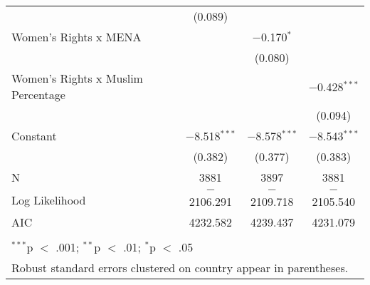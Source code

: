 \begin{table}[!htbp]
\begin{tabular}{@{\extracolsep{5pt}}lccc}
  & (0.089) &  &  \\ 
  Women's Rights x MENA &  & $-$0.170$^{*}$ &  \\ 
  &  & (0.080) &  \\ 
  Women's Rights x Muslim Percentage &  &  & $-$0.428$^{***}$ \\ 
  &  &  & (0.094) \\ 
  Constant & $-$8.518$^{***}$ & $-$8.578$^{***}$ & $-$8.543$^{***}$ \\ 
  & (0.382) & (0.377) & (0.383) \\ 
 N & 3881 & 3897 & 3881 \\ 
Log Likelihood & $-$2106.291 & $-$2109.718 & $-$2105.540 \\ 
AIC & 4232.582 & 4239.437 & 4231.079 \\ 
\hline \\[-1.8ex] 
\multicolumn{4}{l}{$^{***}$p $<$ .001; $^{**}$p $<$ .01; $^{*}$p $<$ .05} \\ 
\multicolumn{4}{l}{Robust standard errors clustered on country appear in parentheses.} \\ 
\end{tabular} 
\end{table} 
